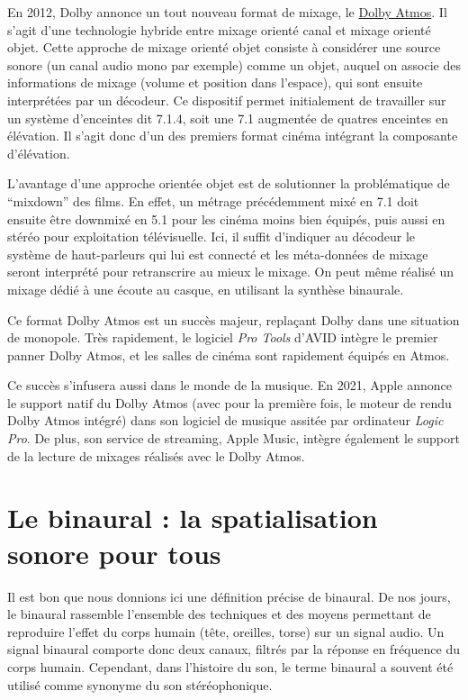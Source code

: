 \documentclass[
  letterpaper,
  DIV=11,
  numbers=noendperiod]{scrreprt}
\begin{document}
En 2012, Dolby annonce un tout nouveau format de mixage, le
\href{https://en.wikipedia.org/wiki/Dolby_Atmos}{Dolby Atmos}. Il s'agit
d'une technologie hybride entre mixage orienté canal et mixage orienté
objet. Cette approche de mixage orienté objet consiste à considérer une
source sonore (un canal audio mono par exemple) comme un objet, auquel
on associe des informations de mixage (volume et position dans
l'espace), qui sont ensuite interprétées par un décodeur. Ce dispositif
permet initialement de travailler sur un système d'enceintes dit 7.1.4,
soit une 7.1 augmentée de quatres enceintes en élévation. Il s'agit donc
d'un des premiers format cinéma intégrant la composante d'élévation.

L'avantage d'une approche orientée objet est de solutionner la
problématique de ``mixdown'' des films. En effet, un métrage
précédemment mixé en 7.1 doit ensuite être downmixé en 5.1 pour les
cinéma moins bien équipés, puis aussi en stéréo pour exploitation
télévisuelle. Ici, il suffit d'indiquer au décodeur le système de
haut-parleurs qui lui est connecté et les méta-données de mixage seront
interprété pour retranscrire au mieux le mixage. On peut même réalisé un
mixage dédié à une écoute au casque, en utilisant la synthèse binaurale.

Ce format Dolby Atmos est un succès majeur, replaçant Dolby dans une
situation de monopole. Très rapidement, le logiciel \emph{Pro Tools}
d'AVID intègre le premier panner Dolby Atmos, et les salles de cinéma
sont rapidement équipés en Atmos.

Ce succès s'infusera aussi dans le monde de la musique. En 2021, Apple
annonce le support natif du Dolby Atmos (avec pour la première fois, le
moteur de rendu Dolby Atmos intégré) dans son logiciel de musique
assitée par ordinateur \emph{Logic Pro}. De plus, son service de
streaming, Apple Music, intègre également le support de la lecture de
mixages réalisés avec le Dolby Atmos.

\hypertarget{le-binaural-la-spatialisation-sonore-pour-tous}{%
\section{Le binaural : la spatialisation sonore pour
tous}\label{le-binaural-la-spatialisation-sonore-pour-tous}}

Il est bon que nous donnions ici une définition précise de binaural. De
nos jours, le binaural rassemble l'ensemble des techniques et des moyens
permettant de reproduire l'effet du corps humain (tête, oreilles, torse)
sur un signal audio. Un signal binaural comporte donc deux canaux,
filtrés par la réponse en fréquence du corps humain. Cependant, dans
l'histoire du son, le terme binaural a souvent été utilisé comme
synonyme du son stéréophonique.
\end{document}
